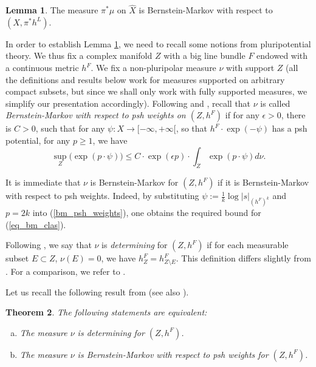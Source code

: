 \documentclass[12pt]{article}
\numberwithin{equation}{section}
\theoremstyle{theorem}
\newtheorem{thm}{Theorem}[section]
\theoremstyle{definition}
\newtheorem{lem}[thm]{Lemma}
\theoremstyle{remark}
\begin{document}
	\begin{lem}\label{lem_bm}
		The measure $\pi^* \mu$ on $\hat{X}$ is Bernstein-Markov with respect to $(X, \pi^* h^L)$.
	\end{lem}
	In order to establish Lemma \ref{lem_bm}, we need to recall some notions from pluripotential theory.
	We thus fix a complex manifold $Z$ with a big line bundle $F$ endowed with a continuous metric $h^F$.
	We fix a non-pluripolar measure $\nu$ with support $Z$ (all the definitions and results below work for measures supported on arbitrary compact subsets, but since we shall only work with fully supported measures, we simplify our presentation accordingly).
	Following \cite{SiciakDetermMeas} and \cite{BerBoucNys}, recall that $\nu$ is called \textit{Bernstein-Markov with respect to psh weights on $(Z, h^F)$} if for any $\epsilon > 0$, there is $C > 0$, such that for any $\psi: X \to [- \infty, +\infty[$, so that $h^F \cdot \exp(- \psi)$ has a psh potential, for any $p \geq 1$, we have
	\begin{equation}\label{bm_psh_weights}
		\sup_Z \big( \exp(p \cdot \psi) \big)
		\leq
		C
		\cdot
		\exp(\epsilon p)
		\cdot
		\int_Z \exp(p \cdot \psi) d \nu.
	\end{equation}
	\par 
	It is immediate that $\nu$ is Bernstein-Markov for $(Z, h^F)$ if it is Bernstein-Markov with respect to psh weights.
	Indeed, by substituting $\psi := \frac{1}{k} \log |s|_{(h^F)^k}$ and $p = 2k$ into (\ref{bm_psh_weights}), one obtains the required bound for (\ref{eq_bm_clas}).
	\par 
	Following \cite{BermanBouckBalls}, we say that $\nu$ is \textit{determining} for $(Z, h^F)$ if for each measurable subset $E \subset Z$, $\nu(E) = 0$, we have $h^F_{Z} = h^F_{Z \setminus E}$.
	This definition differs slightly from \cite{SiciakDetermMeas}. 
	For a comparison, we refer to \cite[Proposition 3.6]{FinEigToepl}.
	\par 
	Let us recall the following result from \cite[Theorem 1.14]{BerBoucNys} (see also \cite[Theorems 5.1 and 5.2]{SiciakDetermMeas}).
	\begin{thm}\label{thm_bbwn_determining}
		The following statements are equivalent: 
		\begin{enumerate}[a)]
			\item The measure $\nu$ is determining for $(Z, h^F)$.
			\item The measure $\nu$ is Bernstein-Markov with respect to psh weights for $(Z, h^F)$.
		\end{enumerate}
	\end{thm}
\end{document}
